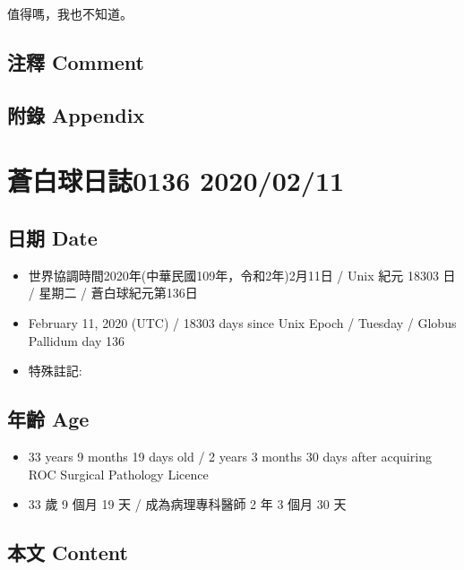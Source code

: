 \documentclass[a5paper, 12pt
]{book}
\providecommand{\tightlist}{%
  \setlength{\itemsep}{0pt}\setlength{\parskip}{0pt}}
\begin{document}
值得嗎，我也不知道。

\hypertarget{ux6ce8ux91cb-comment-70}{%
\subsection{注釋 Comment}\label{ux6ce8ux91cb-comment-70}}

\hypertarget{ux9644ux9304-appendix-71}{%
\subsection{附錄 Appendix}\label{ux9644ux9304-appendix-71}}

\hypertarget{ux84bcux767dux7403ux65e5ux8a8c0136-20200211}{%
\section{蒼白球日誌0136
2020/02/11}\label{ux84bcux767dux7403ux65e5ux8a8c0136-20200211}}

\hypertarget{ux65e5ux671f-date-72}{%
\subsection{日期 Date}\label{ux65e5ux671f-date-72}}

\begin{itemize}
\tightlist
\item
  世界協調時間2020年(中華民國109年，令和2年)2月11日 / Unix 紀元 18303 日
  / 星期二 / 蒼白球紀元第136日
\item
  February 11, 2020 (UTC) / 18303 days since Unix Epoch / Tuesday /
  Globus Pallidum day 136
\item
  特殊註記:
\end{itemize}

\hypertarget{ux5e74ux9f61-age-72}{%
\subsection{年齡 Age}\label{ux5e74ux9f61-age-72}}

\begin{itemize}
\tightlist
\item
  33 years 9 months 19 days old / 2 years 3 months 30 days after
  acquiring ROC Surgical Pathology Licence
\item
  33 歲 9 個月 19 天 / 成為病理專科醫師 2 年 3 個月 30 天
\end{itemize}

\hypertarget{ux672cux6587-content-72}{%
\subsection{本文 Content}\label{ux672cux6587-content-72}}
\end{document}

